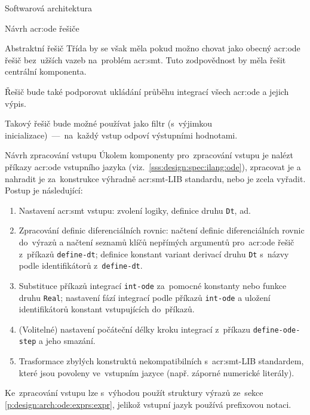 \documentclass[thesis=M,czech]{FITthesis}[2012/06/26]
\newcommand{\acrlabel}[1]{acr:#1}
\newcommand{\acr}[1]{\acrshort{\acrlabel{#1}}}
\newcommand{\id}[1]{\texttt{#1}}
\newcommand{\rf}[1]{\ref{#1}}
\begin{document}
\begin{section}{Softwarová architektura}
\begin{subsection}{Návrh \acr{ode} řešiče}
\begin{subsubsection}{Abstraktní řešič}
Třída by se však měla pokud možno chovat
jako obecný \acr{ode} řešič
bez~užších vazeb na~problém \acr{smt}.
Tuto zodpovědnost by měla řešit centrální komponenta.

Řešič bude také podporovat ukládání průběhu
integrací všech \acr{ode} a jejich výpis.

Takový řešič bude možné používat jako filtr
(s~výjimkou inicializace)~---~na~každý vstup
odpoví výstupními hodnotami.
\end{subsubsection} %


\end{subsection} %


\begin{subsection}{Návrh zpracování vstupu}\label{ss:design:arch:parse}
Úkolem komponenty pro~zpracování vstupu
je nalézt příkazy \acr{ode} vstupního jazyka
(viz.~\rf{sss:design:spec:ilang:ode}),
zpracovat je a nahradit je za~konstrukce
výhradně \acr{smt}-LIB standardu,
nebo je zcela vyřadit.
Postup je následující:
\begin{enumerate}
\item Nastavení \acr{smt} vstupu: zvolení logiky,
   definice druhu \id{Dt}, ad.
\item Zpracování definic diferenciálních rovnic:
   načtení definic diferenciálních rovnic do~výrazů
   a načtení seznamů klíčů nepřímých argumentů pro~\acr{ode} řešič
   z~příkazů \id{define\--dt};
   definice konstant variant derivací druhu \id{Dt}
   s~názvy podle identifikátorů z~\id{define\--dt}.
\item Substituce příkazů integrací \id{int\--ode}
   za~pomocné konstanty nebo funkce druhu \id{Real};
   nastavení fází integrací
   podle příkazů \id{int\--ode}
   a uložení identifikátorů konstant vstupujících do~příkazů.
\item (Volitelné) nastavení počáteční délky kroku integrací
   z~příkazu \id{define\--ode\--step} a jeho smazání.
\item Trasformace zbylých konstruktů nekompatibilních
   s~\acr{smt}-LIB standardem, které jsou povoleny ve~vstupním jazyce
   (např. záporné numerické literály).
\end{enumerate}

Ke~zpracování vstupu lze s~výhodou
použít struktury výrazů
ze~sekce \rf{p:design:arch:ode:exprs:expr},
jelikož vstupní jazyk používá prefixovou notaci.
\end{subsection} %


\end{section}
\end{document}
